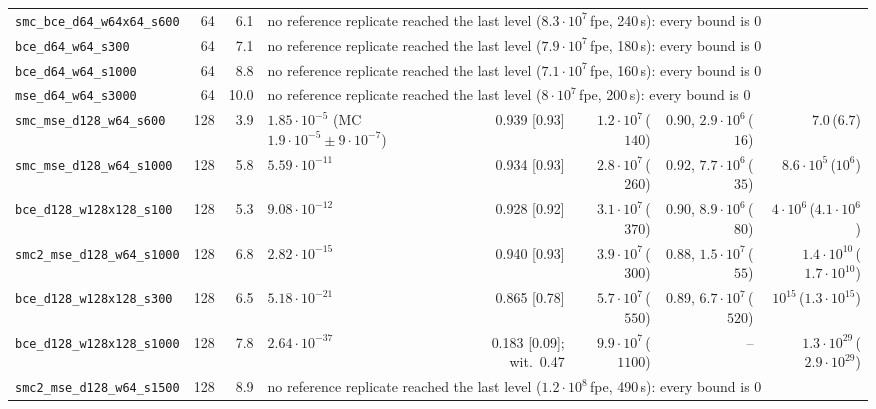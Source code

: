 \begin{tabular}{lrrlrrrr}
\texttt{smc\_bce\_d64\_w64x64\_s600} & 64 & 6.1 & \multicolumn{5}{l}{no reference replicate reached the last level ($8.3\cdot10^{7}$\,fpe, 240\,s): every bound is $0$}\\
\texttt{bce\_d64\_w64\_s300} & 64 & 7.1 & \multicolumn{5}{l}{no reference replicate reached the last level ($7.9\cdot10^{7}$\,fpe, 180\,s): every bound is $0$}\\
\texttt{bce\_d64\_w64\_s1000} & 64 & 8.8 & \multicolumn{5}{l}{no reference replicate reached the last level ($7.1\cdot10^{7}$\,fpe, 160\,s): every bound is $0$}\\
\texttt{mse\_d64\_w64\_s3000} & 64 & 10.0 & \multicolumn{5}{l}{no reference replicate reached the last level ($8\cdot10^{7}$\,fpe, 200\,s): every bound is $0$}\\
\texttt{smc\_mse\_d128\_w64\_s600} & 128 & 3.9 & $1.85\cdot10^{-5}$ (MC $1.9\cdot10^{-5}\pm9\cdot10^{-7}$) & 0.939 [0.93] & $1.2\cdot10^{7}$\,($140$) & 0.90, $2.9\cdot10^{6}$\,($16$) & $7.0$\,($6.7$)\\
\texttt{smc\_mse\_d128\_w64\_s1000} & 128 & 5.8 & $5.59\cdot10^{-11}$ & 0.934 [0.93] & $2.8\cdot10^{7}$\,($260$) & 0.92, $7.7\cdot10^{6}$\,($35$) & $8.6\cdot10^{5}$\,($10^{6}$)\\
\texttt{bce\_d128\_w128x128\_s100} & 128 & 5.3 & $9.08\cdot10^{-12}$ & 0.928 [0.92] & $3.1\cdot10^{7}$\,($370$) & 0.90, $8.9\cdot10^{6}$\,($80$) & $4\cdot10^{6}$\,($4.1\cdot10^{6}$)\\
\texttt{smc2\_mse\_d128\_w64\_s1000} & 128 & 6.8 & $2.82\cdot10^{-15}$ & 0.940 [0.93] & $3.9\cdot10^{7}$\,($300$) & 0.88, $1.5\cdot10^{7}$\,($55$) & $1.4\cdot10^{10}$\,($1.7\cdot10^{10}$)\\
\texttt{bce\_d128\_w128x128\_s300} & 128 & 6.5 & $5.18\cdot10^{-21}$ & 0.865 [0.78] & $5.7\cdot10^{7}$\,($550$) & 0.89, $6.7\cdot10^{7}$\,($520$) & $10^{15}$\,($1.3\cdot10^{15}$)\\
\texttt{bce\_d128\_w128x128\_s1000} & 128 & 7.8 & $2.64\cdot10^{-37}$ & 0.183 [0.09]; wit.\ 0.47 & $9.9\cdot10^{7}$\,($1100$) & -- & $1.3\cdot10^{29}$\,($2.9\cdot10^{29}$)\\
\texttt{smc2\_mse\_d128\_w64\_s1500} & 128 & 8.9 & \multicolumn{5}{l}{no reference replicate reached the last level ($1.2\cdot10^{8}$\,fpe, 490\,s): every bound is $0$}\\
\bottomrule
\end{tabular}
